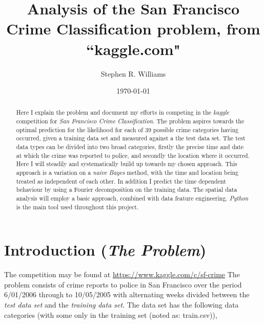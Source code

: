 \documentclass[12pt,notitlepage]{article}
\title{Analysis of the San Francisco Crime Classification problem, from ``kaggle.com"}
\author{Stephen R. Williams}
\date{\today}                                           %
\begin{document}
\maketitle

\begin{abstract}
Here I explain the problem and document my efforts in competing in the \emph{kaggle} competition for \emph{San Francisco Crime Classification}. The problem aspires towards the optimal prediction for the likelihood for each of 39 possible crime categories having occurred, given a training data set and measured against a the test data set. The test data types can be divided into two broad categories, firstly the precise time and date at which the crime was reported to police, and secondly the location where it occurred. Here I will steadily and systematically build up towards my chosen approach. This approach is a variation on a \emph{naive Bayes} method, with the time and location being treated as independent of each other. In addition I predict the time dependent behaviour by using a Fourier decomposition on the training data. The spatial data analysis will employ a basic approach, combined with data feature engineering. \emph{Python} is the main tool used throughout this project.
\end{abstract}

\section{Introduction (\emph{The Problem})}

The competition may be found at \url{https://www.kaggle.com/c/sf-crime} The problem consists of crime reports to police in San Francisco over the period 6/01/2006 through to 10/05/2005 with alternating weeks divided between the \emph{test data set} and the \emph{training data set}. The data set has the following data categories (with some only in the training set (noted as: train.csv)),
\end{document}
